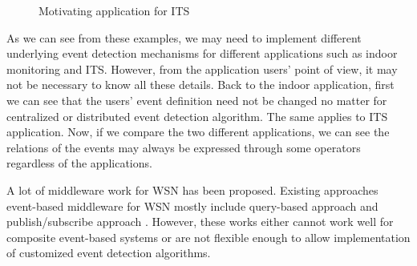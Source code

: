 \begin{figure}
\centering
{}
\caption{Motivating application for ITS}
\label{fig:its}
\end{figure}

As we can see from these examples, we may need to implement different underlying event detection mechanisms for different applications such as indoor monitoring and ITS. However, from the application users' point of view, it may not be necessary to know all these details. Back to the indoor application, first we can see that the users' event definition need not be changed no matter for centralized or distributed event detection algorithm. The same applies to ITS application. Now, if we compare the two different applications, we can see the relations of the events may always be expressed through some operators regardless of the applications. %

A lot of middleware work for WSN has been proposed. Existing approaches event-based middleware for WSN mostly include query-based approach \cite{tinydb} and publish/subscribe approach \cite{complexevent}. However, these works either cannot work well for composite event-based systems or are not flexible enough to allow implementation of customized event detection algorithms. 


 
